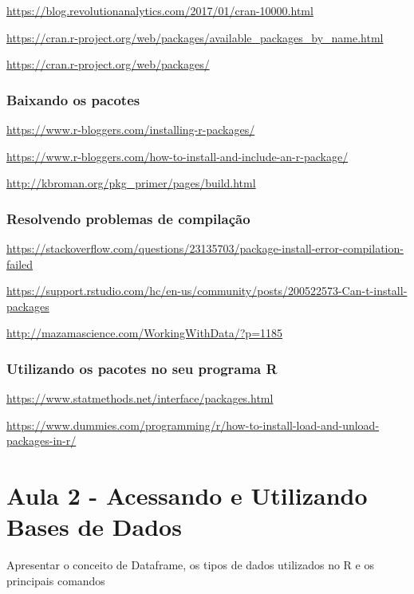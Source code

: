 \documentclass[12pt,a4paper,oneside]{erdc}
\begin{document}
\url{https://blog.revolutionanalytics.com/2017/01/cran-10000.html}

\url{https://cran.r-project.org/web/packages/available_packages_by_name.html}

\url{https://cran.r-project.org/web/packages/}

\subsection{Baixando os pacotes}

\url{https://www.r-bloggers.com/installing-r-packages/}

\url{https://www.r-bloggers.com/how-to-install-and-include-an-r-package/}

\url{http://kbroman.org/pkg_primer/pages/build.html}


\subsection{Resolvendo problemas de compilação}

\url{https://stackoverflow.com/questions/23135703/package-install-error-compilation-failed}

\url{https://support.rstudio.com/hc/en-us/community/posts/200522573-Can-t-install-packages}

\url{http://mazamascience.com/WorkingWithData/?p=1185}


\subsection{Utilizando os pacotes no seu programa R}

\url{https://www.statmethods.net/interface/packages.html}

\url{https://www.dummies.com/programming/r/how-to-install-load-and-unload-packages-in-r/}






%
%
		
\chapter{Aula 2 - Acessando e Utilizando Bases de Dados}

Apresentar o conceito de Dataframe, os tipos de dados utilizados no R e os principais comandos  
\end{document}
